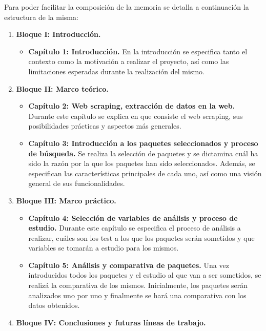 Para poder facilitar la composición de la memoria se detalla a continuación la estructura de la misma:
\begin{enumerate}
  \item {\bfseries Bloque I: Introducción. }
        \begin{itemize}
          \item {\bfseries Capítulo 1: Introducción. \justify}
                En la introducción se especifica tanto el contexto como la motivación a realizar el 
                proyecto, así como las limitaciones esperadas durante la realización del mismo.
        \end{itemize}
  \item {\bfseries Bloque II: Marco teórico. }
        \begin{itemize}
          \item {\bfseries Capítulo 2: Web scraping, extracción de datos en la web. \justify}
                Durante este capítulo se explica en que consiste el web scraping, sus posibilidades 
                prácticas y aspectos más generales.
          \item {\bfseries Capítulo 3: Introducción a los paquetes seleccionados y proceso de búsqueda. \justify}
                Se realiza la selección de paquetes y se dictamina cuál ha sido la razón por la que los 
                paquetes han sido seleccionados. Además, se especifican las características principales 
                de cada uno, así como una visión general de sus funcionalidades.
        \end{itemize}
  \item {\bfseries Bloque III: Marco práctico. }
        \begin{itemize}
          \item {\bfseries Capítulo 4: Selección de variables de análisis y proceso de estudio. \justify}
                Durante este capítulo se especifica el proceso de análisis a realizar, cuáles son los test 
                a los que los paquetes serán sometidos y que variables se tomarán a estudio para los 
                mismos.
          \item {\bfseries Capítulo 5: Análisis y comparativa de paquetes. \justify}
                Una vez introducidos todos los paquetes y el estudio al que van a ser sometidos, se realizá 
                la comparativa de los mismos. Inicialmente, los paquetes serán analizados uno por uno y 
                finalmente se hará una comparativa con los datos obtenidos.
        \end{itemize}
  \item {\bfseries Bloque IV: Conclusiones y futuras líneas de trabajo. }
\end{enumerate}

